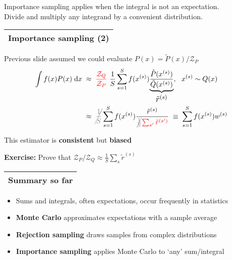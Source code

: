 \documentclass[25pt,landscape]{foils}
\newcommand{\Red}{\textcolor{red}}
\newcommand{\Gray}{\textcolor{mygray}}
\newcommand{\LightGray}{\textcolor{mylightgray}}
\newcommand{\Green}{\textcolor{mypine}}
\def\clap#1{\hbox to 0pt{\hss#1\hss}}
\def\mathclap{\mathpalette\mathclapinternal}
\def\mathclapinternal#1#2{%
\clap{$\mathsurround=0pt#1{#2}$}}
\newcommand{\myfoilhead}[1]{
\newpage
\vspace*{-1cm}
\Gray{
\begin{tabular*}{\textwidth}{l}
{\bf \Huge #1} \\
\bottomrule
\end{tabular*}}}
\newcommand{\Z}{\mathcal{Z}}
\begin{document}
\vfill

Importance sampling applies when the integral is not an expectation.\\
Divide and multiply any integrand by a convenient distribution.

\myfoilhead{Importance sampling (2)}


\vfill

Previous slide assumed we could evaluate $P(x)=\tilde{P}(x)/\Z_P$
\[
\begin{split}
    \int f(x)P(x) \;\mathrm{d}x &\;\approx\; \Red{\frac{\Z_Q}{\Z_P}}~\frac{1}{S} \sum_{s=1}^S f(x^{(s)})%
    \underset{\mathclap{\mbox{\large $\tilde{r}^{(s)}$}}}{\underbrace{\frac{\tilde{P}(x^{(s)})}{\tilde{Q}(x^{(s)})}}}, ~~x^{(s)}\sim Q(x)\\
    & \;\approx\; \LightGray{\cancel{\frac{1}{S}}}\sum_{s=1}^S f(x^{(s)}) \frac{\tilde{r}^{(s)}}{\LightGray{\cancel{\frac{1}{S}}}\Red{\sum_{s'} \tilde{r}^{(s')}}}
    \;\equiv\;\sum_{s=1}^S f(x^{(s)}) w^{(s)}
\end{split}
\]

This estimator is \Green{\bf consistent} but \Green{\bf biased}

\vfill
\Green{\bf Exercise:} Prove that ${\Z_P}/{\Z_Q}\approx \frac{1}{S}\sum_s \tilde{r}^{(s)}$

% 
% 
% 
% 
% 

\myfoilhead{Summary so far}

\vfill

\begin{itemize}
    \setlength{\itemsep}{10pt}
    \setlength{\parskip}{10pt}
    \setlength{\parsep}{0cm}

\item Sums and integrals, often expectations, occur frequently in statistics

\item \Green{\bf Monte Carlo} approximates expectations with a sample average

\item \Green{\bf Rejection sampling} draws samples from complex distributions

\item \Green{\bf Importance sampling} applies Monte Carlo to `any' sum/integral

\end{itemize}
\end{document}

